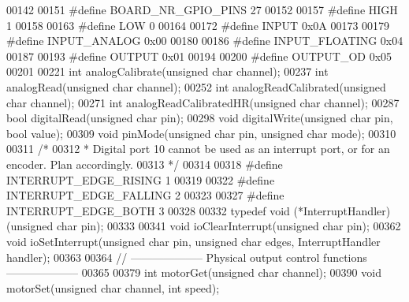 \begin{DoxyCode}
00142 
00151 \textcolor{preprocessor}{#define BOARD\_NR\_GPIO\_PINS 27}
00152 
00157 \textcolor{preprocessor}{#define HIGH 1}
00158 
00163 \textcolor{preprocessor}{#define LOW 0}
00164 
00172 \textcolor{preprocessor}{#define INPUT 0x0A}
00173 
00179 \textcolor{preprocessor}{#define INPUT\_ANALOG 0x00}
00180 
00186 \textcolor{preprocessor}{#define INPUT\_FLOATING 0x04}
00187 
00193 \textcolor{preprocessor}{#define OUTPUT 0x01}
00194 
00200 \textcolor{preprocessor}{#define OUTPUT\_OD 0x05}
00201 
00221 \textcolor{keywordtype}{int} analogCalibrate(\textcolor{keywordtype}{unsigned} \textcolor{keywordtype}{char} channel);
00237 \textcolor{keywordtype}{int} analogRead(\textcolor{keywordtype}{unsigned} \textcolor{keywordtype}{char} channel);
00252 \textcolor{keywordtype}{int} analogReadCalibrated(\textcolor{keywordtype}{unsigned} \textcolor{keywordtype}{char} channel);
00271 \textcolor{keywordtype}{int} analogReadCalibratedHR(\textcolor{keywordtype}{unsigned} \textcolor{keywordtype}{char} channel);
00287 \textcolor{keywordtype}{bool} digitalRead(\textcolor{keywordtype}{unsigned} \textcolor{keywordtype}{char} pin);
00298 \textcolor{keywordtype}{void} digitalWrite(\textcolor{keywordtype}{unsigned} \textcolor{keywordtype}{char} pin, \textcolor{keywordtype}{bool} value);
00309 \textcolor{keywordtype}{void} pinMode(\textcolor{keywordtype}{unsigned} \textcolor{keywordtype}{char} pin, \textcolor{keywordtype}{unsigned} \textcolor{keywordtype}{char} mode);
00310 
00311 \textcolor{comment}{/*}
00312 \textcolor{comment}{ * Digital port 10 cannot be used as an interrupt port, or for an encoder. Plan accordingly.}
00313 \textcolor{comment}{ */}
00314 
00318 \textcolor{preprocessor}{#define INTERRUPT\_EDGE\_RISING 1}
00319 
00322 \textcolor{preprocessor}{#define INTERRUPT\_EDGE\_FALLING 2}
00323 
00327 \textcolor{preprocessor}{#define INTERRUPT\_EDGE\_BOTH 3}
00328 
00332 \textcolor{keyword}{typedef} void (*InterruptHandler)(\textcolor{keywordtype}{unsigned} \textcolor{keywordtype}{char} pin);
00333 
00341 \textcolor{keywordtype}{void} ioClearInterrupt(\textcolor{keywordtype}{unsigned} \textcolor{keywordtype}{char} pin);
00362 \textcolor{keywordtype}{void} ioSetInterrupt(\textcolor{keywordtype}{unsigned} \textcolor{keywordtype}{char} pin, \textcolor{keywordtype}{unsigned} \textcolor{keywordtype}{char} edges, InterruptHandler handler);
00363 
00364 \textcolor{comment}{// -------------------- Physical output control functions --------------------}
00365 
00379 \textcolor{keywordtype}{int} motorGet(\textcolor{keywordtype}{unsigned} \textcolor{keywordtype}{char} channel);
00390 \textcolor{keywordtype}{void} motorSet(\textcolor{keywordtype}{unsigned} \textcolor{keywordtype}{char} channel, \textcolor{keywordtype}{int} speed);

\end{DoxyCode}
